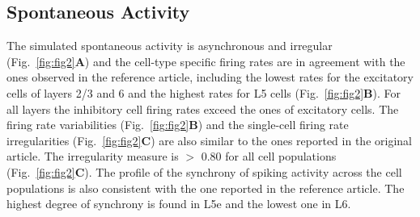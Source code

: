 \documentclass[10pt,a4paper,onecolumn]{article}
\begin{document}
\subsection{Spontaneous Activity}
The simulated spontaneous activity is asynchronous and irregular (Fig.~\ref{fig:fig2}\textbf{A}) and the cell-type specific firing rates are in agreement with the ones observed in the reference article, including the lowest rates for the excitatory cells of layers 2/3 and 6 and the highest rates for L5 cells (Fig.~\ref{fig:fig2}\textbf{B}). For all layers the inhibitory cell firing rates exceed the ones of excitatory cells. The firing rate variabilities (Fig.~\ref{fig:fig2}\textbf{B}) and the single-cell firing rate irregularities (Fig.~\ref{fig:fig2}\textbf{C}) are also similar to the ones reported in the original article. The irregularity measure is $>$ 0.80 for all cell populations (Fig.~\ref{fig:fig2}\textbf{C}). The profile of the synchrony of spiking activity across the cell populations is also consistent with the one reported in the reference article. The highest degree of synchrony is found in L5e and the lowest one in L6. 
\end{document}
